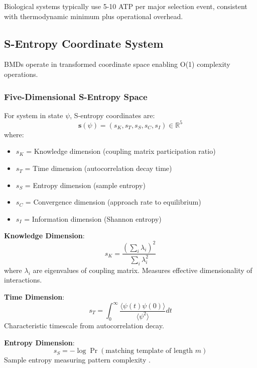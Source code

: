 \documentclass[11pt,onecolumn]{article}
\begin{document}
Biological systems typically use 5-10 ATP per major selection event, consistent with thermodynamic minimum plus operational overhead.

\subsection{S-Entropy Coordinate System}

BMDs operate in transformed coordinate space enabling O(1) complexity operations.

\subsubsection{Five-Dimensional S-Entropy Space}

\begin{definition}
For system in state $\psi$, S-entropy coordinates are:
\begin{equation}
\mathbf{s}(\psi) = (s_K, s_T, s_S, s_C, s_I) \in \mathbb{R}^5
\end{equation}
where:
\begin{itemize}
\item $s_K$ = Knowledge dimension (coupling matrix participation ratio)
\item $s_T$ = Time dimension (autocorrelation decay time)  
\item $s_S$ = Entropy dimension (sample entropy)
\item $s_C$ = Convergence dimension (approach rate to equilibrium)
\item $s_I$ = Information dimension (Shannon entropy)
\end{itemize}
\end{definition}

\textbf{Knowledge Dimension}:
\begin{equation}
s_K = \frac{(\sum_i \lambda_i)^2}{\sum_i \lambda_i^2}
\end{equation}
where $\lambda_i$ are eigenvalues of coupling matrix. Measures effective dimensionality of interactions.

\textbf{Time Dimension}:
\begin{equation}
s_T = \int_0^{\infty} \frac{\langle \psi(t) \psi(0) \rangle}{\langle \psi^2 \rangle} dt
\end{equation}
Characteristic timescale from autocorrelation decay.

\textbf{Entropy Dimension}:
\begin{equation}
s_S = -\log \Pr(\text{matching template of length } m)
\end{equation}
Sample entropy measuring pattern complexity \citep{richman2000physiological}.
\end{document}
